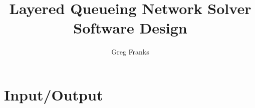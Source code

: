 \documentclass{book}
\title{Layered Queueing Network Solver Software Design}
\author{Greg Franks}
\begin{document}

\maketitle
\clearpage
\tableofcontents
\clearpage






\chapter{Input/Output}


\end{document}
